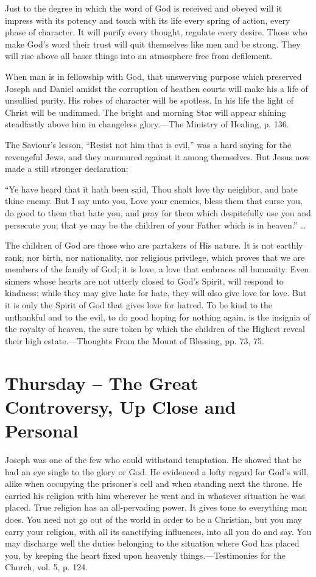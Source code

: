 \documentclass[a4paper, 10pt, twoside, headings=small]{scrartcl}
\begin{document}
\begin{multicols}{2}
Just to the degree in which the word of God is received and obeyed will it impress with its potency and touch with its life every spring of action, every phase of character. It will purify every thought, regulate every desire. Those who make God’s word their trust will quit themselves like men and be strong. They will rise above all baser things into an atmosphere free from defilement.

When man is in fellowship with God, that unswerving purpose which preserved Joseph and Daniel amidst the corruption of heathen courts will make his a life of unsullied purity. His robes of character will be spotless. In his life the light of Christ will be undimmed. The bright and morning Star will appear shining steadfastly above him in changeless glory.—The Ministry of Healing, p. 136.

The Saviour’s lesson, “Resist not him that is evil,” was a hard saying for the revengeful Jews, and they murmured against it among themselves. But Jesus now made a still stronger declaration:

“Ye have heard that it hath been said, Thou shalt love thy neighbor, and hate thine enemy. But I say unto you, Love your enemies, bless them that curse you, do good to them that hate you, and pray for them which despitefully use you and persecute you; that ye may be the children of your Father which is in heaven.” …

The children of God are those who are partakers of His nature. It is not earthly rank, nor birth, nor nationality, nor religious privilege, which proves that we are members of the family of God; it is love, a love that embraces all humanity. Even sinners whose hearts are not utterly closed to God’s Spirit, will respond to kindness; while they may give hate for hate, they will also give love for love. But it is only the Spirit of God that gives love for hatred. To be kind to the unthankful and to the evil, to do good hoping for nothing again, is the insignia of the royalty of heaven, the sure token by which the children of the Highest reveal their high estate.—Thoughts From the Mount of Blessing, pp. 73, 75.

\section*{Thursday – The Great Controversy, Up Close and Personal}

Joseph was one of the few who could withstand temptation. He showed that he had an eye single to the glory or God. He evidenced a lofty regard for God’s will, alike when occupying the prisoner’s cell and when standing next the throne. He carried his religion with him wherever he went and in whatever situation he was placed. True religion has an all-pervading power. It gives tone to everything man does. You need not go out of the world in order to be a Christian, but you may carry your religion, with all its sanctifying influences, into all you do and say. You may discharge well the duties belonging to the situation where God has placed you, by keeping the heart fixed upon heavenly things.—Testimonies for the Church, vol. 5, p. 124.


\end{multicols}
\end{document}
